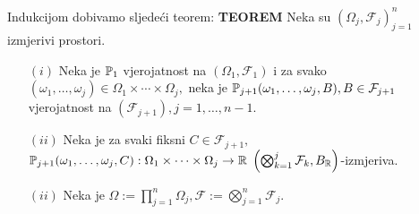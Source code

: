 \documentclass{article}
\begin{document}
Indukcijom dobivamo sljedeći teorem:\newline\newline
\textbf{TEOREM}\newline 
Neka su \((\Omega_j,\mathcal F_j)_{j=1}^n\) izmjerivi prostori. 
\begin{itemize}
    \item[\((i)\)] Neka je \(\Bbb P_1\) vjerojatnost na \((\Omega_1,\mathcal F_1)\) i za svako \((\omega_1,\ldots,\omega_j)\in\Omega_1\times\cdots\times\Omega_j,\) neka je \(\Bbb P_{j+1}(\omega_1,\ldots,\omega_j, B), B\in\mathcal F_{j+1}\) vjerojatnost na \((\mathcal F_{j+1}),j=1,\ldots,n-1.\) 
    \item[\((ii)\)] Neka je za svaki fiksni \(C\in\mathcal F_{j+1},\) \(\Bbb P_{j+1}(\omega_1,\ldots,\omega_j, C):\Omega_1\times\cdots\times\Omega_j\to\Bbb R\) \(\left(\bigotimes_{k=1}^j\mathcal F_k, B_\Bbb R\right)\)-izmjeriva.
    \item[\((ii)\)] Neka je \(\Omega:=\prod_{j=1}^n\Omega_j,\mathcal F:=\bigotimes_{j=1}^n\mathcal F_j.\) 
\end{itemize}
\end{document}
